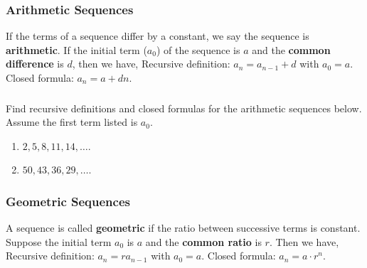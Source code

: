 \documentclass[11pt, compress]{beamer}
\newcommand{\terminology}[1]{\textbf{#1}}
\newcommand{\vtx}[2]{node[fill,circle,inner sep=0pt, minimum size=4pt,label=#1:#2]{}}
\renewcommand{\v}{\vtx{above}{}}
\begin{document}
\begin{frame}
\begin{sidebyside}{1}{0.15}{0.15}{0}
\begin{sbspanel}{0.7}
{
}%
\end{sbspanel}%
\end{sidebyside}%
\end{frame}
 
\begin{frame}
\frametitle{Arithmetic Sequences}
 If the terms of a sequence differ by a constant, we say the sequence is \terminology{arithmetic}.  If the initial term (\(a_0\)) of the sequence is \(a\) and the \terminology{common difference} is \(d\), then we have,
 Recursive definition: \(a_n = a_{n-1} + d\) with \(a_0 = a\).
 Closed formula: \(a_n = a + dn\).
\end{frame}
 
\begin{frame}
\frametitle{}
\begin{example}[2.2.1]Find recursive definitions and closed formulas for the arithmetic sequences below. Assume the first term listed is \(a_0\).
\begin{enumerate}
\item{} \(2, 5, 8, 11, 14, \ldots\).

\item{} \(50, 43, 36, 29, \ldots\).
\end{enumerate}

\end{example}
\end{frame}
 
\begin{frame}
\frametitle{Geometric Sequences}
 A sequence is called \terminology{geometric}  if the ratio between successive terms is constant. Suppose the initial term \(a_0\) is \(a\) and the \terminology{common ratio} is \(r\). Then we have,
 Recursive definition: \(a_n = ra_{n-1}\) with \(a_0 = a\).
 Closed formula: \(a_n = a\cdot r^{n}\).
\end{frame}
 
\end{document}
